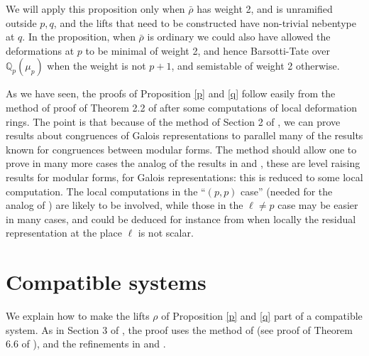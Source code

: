 \documentclass[12pt]{amsart}
\newcommand{\Q}{\mathbb{Q}}
\newcommand{\rhobar}{\overline{\rho}}
\def\rhobar{ {\bar {\rho} } }
\begin{document}
 We will apply this proposition only when $\rhobar$ has weight 2, and 
is unramified outside $p,q$, and the lifts that need to be constructed
have non-trivial nebentype at $q$. In the proposition, 
when $\rhobar$ is ordinary we could also have allowed the 
deformations at $p$ to be minimal of weight 2, and hence 
Barsotti-Tate over $\Q_p(\mu_p)$ when the weight is not $p+1$, and semistable of weight 2 otherwise.

As we have seen, the proofs of Proposition \ref{p} and \ref{q} follow easily from the method of proof of Theorem 2.2 of \cite{KW} after 
some computations of local deformation rings. 
The point is that because of the method of Section 2 of \cite{KW}, we can prove results about congruences of Galois representations to parallel many of the results known for congruences between modular forms.  The method should allow one to prove in many more cases the analog of the results in \cite{DT} and
\cite{inv}, these are level raising results for modular forms, for Galois representations: this is reduced 
to some local computation. The local computations in the ``$(p,p)$ case'' (needed for the analog of \cite{inv}) are likely to be involved, while those in the $\ell \neq p$ case may be easier in many cases, and could be deduced for instance from \cite{Boe} when locally the residual representation at the place $\ell$ is not scalar. 

\section{Compatible systems}\label{comp}

We explain how to make the lifts $\rho$ of Proposition \ref{p} and \ref{q}
part of a compatible system. As in Section 3 of
\cite{KW}, the proof uses the method of \cite{Tay2} (see proof of Theorem 6.6 of \cite{Tay2}), and the refinements in \cite{D} and \cite{Wint}.
\end{document}
